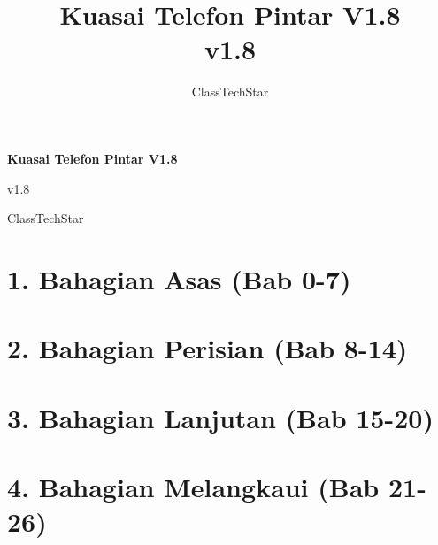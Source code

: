 \documentclass[11pt,a4paper,openany]{book}
\title{Kuasai Telefon Pintar V1.8\\ \large v1.8}
\author{ClassTechStar}
\date{}
\begin{document}
\begin{titlepage}
\centering
\vspace*{0.28\textheight}
{\Huge\bfseries Kuasai Telefon Pintar V1.8\par}
\vspace{1.2em}
{\Large v1.8\par}
\vfill
{\large ClassTechStar\par}
\end{titlepage}
\frontmatter
\tableofcontents
\mainmatter
\part*{1. Bahagian Asas (Bab 0-7)}










\part*{2. Bahagian Perisian (Bab 8-14)}








\part*{3. Bahagian Lanjutan (Bab 15-20)}







\part*{4. Bahagian Melangkaui (Bab 21-26)}







\end{document}
